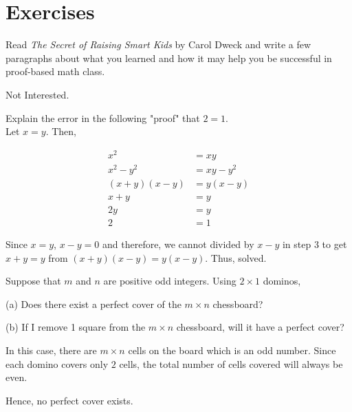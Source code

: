 \section*{Exercises}

\begin{problem}
  Read \emph{The Secret of Raising Smart Kids} by Carol Dweck and write a few paragraphs about what you learned and how it may help you be successful in proof-based math class.
\end{problem}

\begin{solution}
Not Interested.
\end{solution}

\begin{problem}
  Explain the error in the following "proof" that $2 = 1$. \\
  Let $x = y$. Then,

\begin{align}
x^2 &= xy \\
x^2 - y^2 &= xy - y^2 \\
(x+y)(x-y) &= y(x-y) \\
x+y &= y \\
2y &= y \\
2 &= 1
\end{align}
\end{problem}

\begin{solution}
  Since $x = y$, $x-y = 0$ and therefore, we cannot divided by $x-y$ in step $3$ to get $x+y = y$ from $(x+y)(x-y) = y(x-y)$. Thus, solved.
\end{solution}


\begin{problem}
  Suppose that $m$ and $n$ are positive odd integers. Using $2 \times 1$ dominos,

  (a) Does there exist a perfect cover of the $m \times n$ chessboard?

  (b) If I remove 1 square from the $m \times n$ chessboard, will it have a perfect cover?
\end{problem}

\begin{solution}[a]
  In this case, there are $m \times n$ cells on the board which is an odd number. Since each domino covers only $2$ cells, the total number of cells covered will always be even.

  Hence, no perfect cover exists.
\end{solution}

